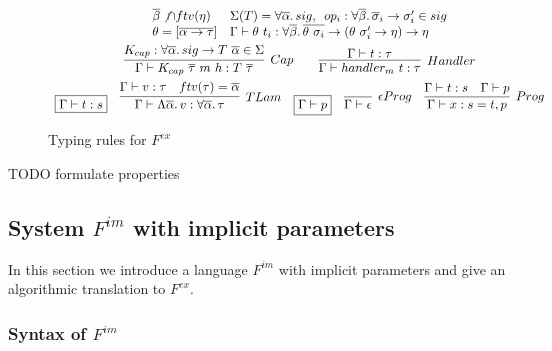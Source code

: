\documentclass[acmsmall]{acmart}
\newcommand{\mathframebox}[1]{\framebox{$\displaystyle #1$}}
\newcommand{\ap}{~}
\begin{document}
\begin{figure}
\begin{gather*}
{            \begin{array}{ll}
                \overline{\beta}\not\cap ftv(\eta) & %
                \Sigma(T) = \forall\overline{\alpha}\ldotp sig, \hspace{0.5em} op_i : \forall\overline{\beta}\ldotp \overline{\sigma}_i\to\sigma'_i \in sig
                \\
                \theta = [\overline{\alpha\to\tau}] &
                \Gamma\vdash\theta\ap t_i : \forall \overline{\beta}\ldotp \overline{\theta\ap\sigma_i}\to(\theta\ap\sigma_i'\to\eta)\to\eta
            \end{array}
        }\\
        \infer[Cap]{
            \Gamma\vdash K_{cap}\ap\overline{\tau}\ap m\ap h : T\ap\overline{\tau}
        }{
            K_{cap} : \forall\overline{\alpha}\ldotp sig\to T\ap\overline{\alpha} \in \Sigma
        } %
        \hspace{2em}
        \infer[Handler]{
            \Gamma\vdash handler_m ~t : \tau
        }{
            \Gamma\vdash t : \tau
        }\\
        \begin{array}{ccccc}
            \mathframebox{\Gamma\vdash t : s} &
            \infer[TLam]{
                \Gamma\vdash\Lambda\overline{\alpha}\ldotp v : \forall\overline{\alpha}\ldotp\tau
            }{
                \Gamma\vdash v : \tau & ftv(\tau) = \overline{\alpha}
            } &
            \mathframebox{\Gamma\vdash p} &
            \infer[\epsilon Prog]{\Gamma\vdash\epsilon}{} &
            \infer[Prog]{\Gamma\vdash x : s = t, p}{\Gamma\vdash t : s & \Gamma\vdash p}
        \end{array}
    \end{gather*}
    \caption{Typing rules for $F^{ex}$}
    \label{fig:fex-typing}
\end{figure}

TODO formulate properties %

\subsection{System $F^{im}$ with implicit parameters} \label{subsec:fim}

In this section we introduce a language $F^{im}$ with implicit parameters and give an algorithmic translation to $F^{ex}$.

\subsubsection{Syntax of $F^{im}$}
\end{document}
